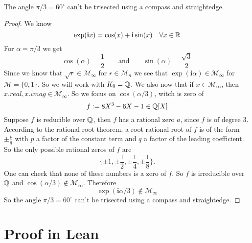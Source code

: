 \documentclass{../Proof_layout_PDF/TemplateExercise}
\begin{document}
\begin{theorem}
    The angle $\pi / 3 = 60^{\circ}$ can't be trisected using a compass and straightedge.
\end{theorem}
\begin{proof}
    We know
    \begin{equation*}
        \exp(\textbf{i}x) = \cos(x) + \textbf{i} \sin(x) \quad \forall x \in \mathbb{R}
    \end{equation*}
    For $\alpha = \pi / 3$ we get
    \begin{equation*}
        \cos(\alpha) = \frac{1}{2}\qquad \text{and}\qquad \sin(\alpha) = \frac{\sqrt{3}}{2}
    \end{equation*}
    Since we know that $\sqrt{r} \in \mathcal{M}_{\infty}$ for $r \in \mathcal{M}_n$
    we see that $\exp(\textbf{i} \alpha) \in \mathcal{M}_{\infty}$ for $\mathcal{M} = \{0,1\}$. \newline
    So we will work with $K_0 = \mathbb{Q}$. \newline
    We also now that if $x\in \mathcal{M}_{\infty}$, then $x.real, x.imag \in \mathcal{M}_{\infty}$. So we focus on $\cos(\alpha/3)$, witch is zero of
    \begin{equation*}
        f := 8 X^3 - 6 X - 1 \in \mathbb{Q}[X]
    \end{equation*}
    Suppose $f$ is reducible over $\mathbb{Q}$, then $f$ has a rational zero $a$, since $f$ is of degree $3$. According to the rational root theorem, a root rational root of $f$ is of the form $\pm \frac{p}{q}$ with $p$ a factor of the constant term and $q$ a factor of the leading coefficient. So the only possible rational zeros of $f$ are
     \begin{equation*}
        \{ \pm 1, \pm \frac{1}{2}, \pm \frac{1}{4}, \pm \frac{1}{8} \}.
     \end{equation*}
     One can check that none of these numbers is a zero of $f$.
     So $f$ is irreducible over $\mathbb{Q}$ and $\cos(\alpha/3) \notin \mathcal{M}_{\infty}$.
     Therefore
        \begin{equation*}
            \exp(\textbf{i} \alpha/3) \notin \mathcal{M}_{\infty}
        \end{equation*}
    So the angle $\pi / 3 = 60^{\circ}$ can't be trisected using a compass and straightedge.
\end{proof}

\section {Proof in Lean}
\end{document}
